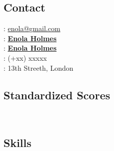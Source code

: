 \documentclass{My_CV}
\begin{document}
\justifying



\setlength{\columnsep}{1cm}
\setlength{\columnseprule}{1.25mm}



\begin{paracol}{2}



\begin{leftcolumn}



\vfill\null
\subsection{{\faTags} Contact}

\textcolor{Tan4}{\faEnvelope} : \href{mailto: enola@gmail.com}{enola@gmail.com} \\
\textcolor{SteelBlue1}{\faLinkedinSquare} : \href{https://google.com}{\textbf{Enola Holmes}} \\
{\faGithub} : \href{https://google.com}{\textbf{Enola Holmes}} \\
\textcolor{Purple3}{\faMobile} : (+xx) xxxxx  \\
\textcolor{Coral2}{\faHome} : 13th Streeth, London



\vfill\null
\subsection{{\faBookmark} Standardized Scores}

 \\




\newpage
\subsection{{\faCubes} Skills}

\setlength{\fboxrule}{3pt}
\fboxsep=7pt


\end{leftcolumn}
\end{paracol}
\end{document}
